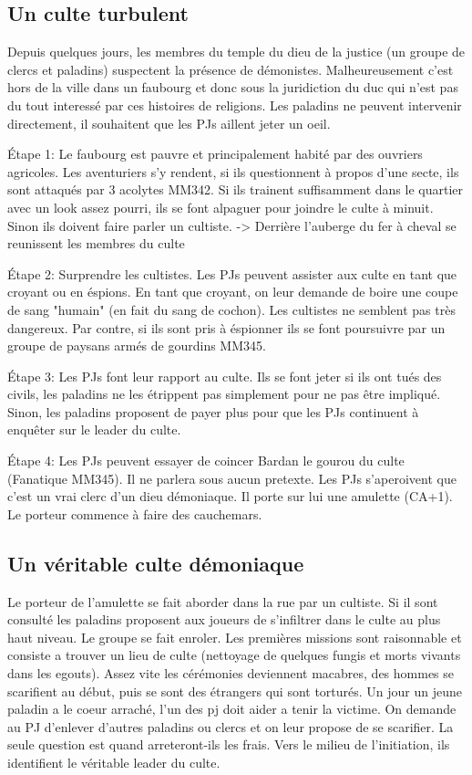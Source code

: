 \subsection{Un culte turbulent}

Depuis quelques jours, les membres du temple du dieu de la justice (un groupe de clercs et paladins) 
suspectent la présence de démonistes. Malheureusement c'est hors de la ville dans un faubourg 
et donc sous la juridiction du duc qui n'est pas du tout interessé par ces histoires de religions.
Les paladins ne peuvent intervenir directement, il souhaitent que les PJs aillent jeter un oeil.

Étape 1: Le faubourg est pauvre et principalement habité par des ouvriers agricoles. Les aventuriers
s'y rendent, si ils questionnent à propos d'une secte, ils sont attaqués par 3 acolytes MM342. Si ils
trainent suffisamment dans le quartier avec un look assez pourri, ils se font alpaguer pour joindre le 
culte à minuit. Sinon ils doivent faire parler un cultiste.
-> Derrière l'auberge du fer à cheval se reunissent les membres du culte

Étape 2: Surprendre les cultistes. Les PJs peuvent assister aux culte en tant que croyant ou en éspions.
En tant que croyant, on leur demande de boire une coupe de sang "humain" (en fait du sang de cochon).
Les cultistes ne semblent pas très dangereux. Par contre, si ils sont pris à éspionner ils se font 
poursuivre par un groupe de paysans armés de gourdins MM345.

Étape 3: Les PJs font leur rapport au culte. Ils se font jeter si ils ont tués des civils, les paladins ne 
les étrippent pas simplement pour ne pas être impliqué. Sinon, les paladins proposent de payer plus pour 
que les PJs continuent à enquêter sur le leader du culte.

Étape 4: Les PJs peuvent essayer de coincer Bardan le gourou du culte (Fanatique MM345). Il ne parlera
sous aucun pretexte. Les PJs s'aperoivent que c'est un vrai clerc d'un dieu démoniaque. Il porte sur lui 
une amulette (CA+1). Le porteur commence à faire des cauchemars.

\subsection{Un véritable culte démoniaque}

Le porteur de l'amulette se fait aborder dans la rue par un cultiste. Si il sont consulté les paladins
proposent aux joueurs de s'infiltrer dans le culte au plus haut niveau. Le groupe se fait enroler. 
Les premières missions sont raisonnable et consiste a trouver un lieu de culte (nettoyage de quelques
fungis et morts vivants dans les egouts). Assez vite les cérémonies deviennent macabres, des hommes se 
scarifient au début, puis se sont des étrangers qui sont torturés. Un jour un jeune paladin a le coeur 
arraché, l'un des pj doit aider a tenir la victime. On demande au PJ d'enlever d'autres paladins ou
clercs et on leur propose de se scarifier. La seule question est quand arreteront-ils les frais. Vers le 
milieu de l'initiation, ils identifient le véritable leader du culte.

